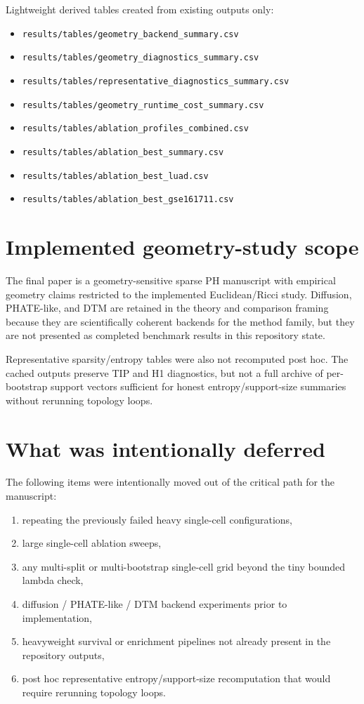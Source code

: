 \documentclass[11pt]{article}
\begin{document}
Lightweight derived tables created from existing outputs only:
\begin{itemize}[leftmargin=1.5em]
\item \texttt{results/tables/geometry\_backend\_summary.csv}
\item \texttt{results/tables/geometry\_diagnostics\_summary.csv}
\item \texttt{results/tables/representative\_diagnostics\_summary.csv}
\item \texttt{results/tables/geometry\_runtime\_cost\_summary.csv}
\item \texttt{results/tables/ablation\_profiles\_combined.csv}
\item \texttt{results/tables/ablation\_best\_summary.csv}
\item \texttt{results/tables/ablation\_best\_luad.csv}
\item \texttt{results/tables/ablation\_best\_gse161711.csv}
\end{itemize}

\section{Implemented geometry-study scope}
The final paper is a geometry-sensitive sparse PH manuscript with empirical geometry claims restricted to the implemented Euclidean/Ricci study. Diffusion, PHATE-like, and DTM are retained in the theory and comparison framing because they are scientifically coherent backends for the method family, but they are not presented as completed benchmark results in this repository state.

Representative sparsity/entropy tables were also not recomputed post hoc. The cached outputs preserve TIP and H1 diagnostics, but not a full archive of per-bootstrap support vectors sufficient for honest entropy/support-size summaries without rerunning topology loops.

\section{What was intentionally deferred}
The following items were intentionally moved out of the critical path for the manuscript:
\begin{enumerate}[leftmargin=1.5em]
\item repeating the previously failed heavy single-cell configurations,
\item large single-cell ablation sweeps,
\item any multi-split or multi-bootstrap single-cell grid beyond the tiny bounded lambda check,
\item diffusion / PHATE-like / DTM backend experiments prior to implementation,
\item heavyweight survival or enrichment pipelines not already present in the repository outputs,
\item post hoc representative entropy/support-size recomputation that would require rerunning topology loops.
\end{enumerate}
\end{document}
